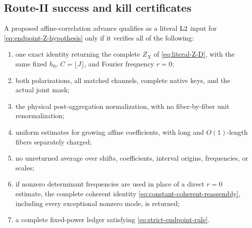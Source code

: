 \subsection{Route-II success and kill certificates}

\begin{definition}
\label{def:route-success}
A proposed affine-correlation advance qualifies as a literal
\(\mathrm{L2}\) input for \eqref{eq:endpoint-Z-hypothesis} only if it
verifies all of the following:
\begin{enumerate}[label=\textup{(\roman*)},leftmargin=2.5em]
 \item one exact identity returning the complete \(Z_X\) of
 \eqref{eq:literal-Z-D}, with the same fixed \(h_0\),
 \(C=\lfloor J\rfloor\), and Fourier frequency \(r=0\);
 \item both polarizations, all matched channels, complete native keys,
 and the actual joint mask;
 \item the physical post-aggregation normalization, with no
 fiber-by-fiber unit renormalization;
 \item uniform estimates for growing affine coefficients, with long
 and \(O(1)\)-length fibers separately charged;
 \item no unreturned average over shifts, coefficients, interval
 origins, frequencies, or scales;
 \item if nonzero determinant frequencies are used in place of a
 direct \(r=0\) estimate, the complete coherent identity
 \eqref{eq:constant-coherent-reassembly}, including every exceptional
 nonzero mode, is returned;
 \item a complete fixed-power ledger satisfying
 \eqref{eq:strict-endpoint-rule}.
\end{enumerate}
\end{definition}

